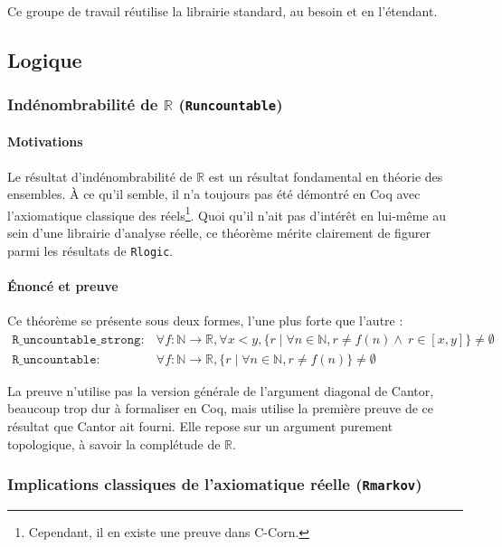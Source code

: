 \documentclass[a4paper,10pt]{article}
\newcommand{\coqcode}[1]{\texttt{#1}}
\begin{document}
Ce groupe de travail réutilise la librairie standard, au besoin et en l'étendant. 



\subsection{Logique}

\subsubsection{Indénombrabilité de $\mathbb{R}$ (\coqcode{Runcountable})}

\paragraph{Motivations}

Le résultat d'indénombrabilité de $\mathbb{R}$ est un résultat fondamental en théorie des ensembles. À ce qu'il semble, il n'a toujours pas été démontré en Coq avec l'axiomatique classique des réels\footnote{Cependant, il en existe une preuve dans C-Corn.}. Quoi qu'il n'ait pas d'intérêt en lui-même au sein d'une librairie d'analyse réelle, ce théorème mérite clairement de figurer parmi les résultats de \coqcode{Rlogic}.

\paragraph{Énoncé et preuve}

Ce théorème se présente sous deux formes, l'une plus forte que l'autre :
$$\begin{array}{ll}
\mathtt{R\_uncountable\_strong} :& \forall f : \mathbb{N}\rightarrow\mathbb{R}, \forall x < y, \{r\mid\forall n\in\mathbb{N}, r \neq f(n) \wedge\ r\in[x, y]\}\neq\emptyset\\
\mathtt{R\_uncountable} :& \forall f : \mathbb{N}\rightarrow\mathbb{R}, \{r\mid\forall n\in\mathbb{N}, r \neq f(n)\}\neq\emptyset
\end{array}$$

La preuve n'utilise pas la version générale de l'argument diagonal de Cantor, beaucoup trop dur à formaliser en Coq, mais utilise la première preuve de ce résultat que Cantor ait fourni. Elle repose sur un argument purement topologique, à savoir la complétude de $\mathbb{R}$.

\subsubsection{Implications classiques de l'axiomatique réelle (\coqcode{Rmarkov})}
\end{document}
